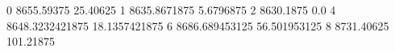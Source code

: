 0 8655.59375 25.40625
1 8635.8671875 5.6796875
2 8630.1875 0.0
4 8648.3232421875 18.1357421875
6 8686.689453125 56.501953125
8 8731.40625 101.21875
